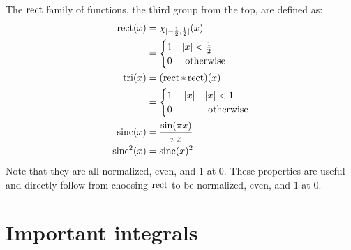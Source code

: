 The $\operatorname{rect}$ family of functions,
the third group from the top,
are defined as:
\[\begin{aligned}
	\rect(x) &= \chi_{[-\frac{1}{2},\frac{1}{2}]}(x) \\
	&= \begin{cases} 1 & |x| < \frac{1}{2}\\ 0 &$ otherwise$\end{cases}\\
	\tri(x) & = (\rect*\rect)(x) \\
	&= \begin{cases} 1- |x| & |x| < 1\\ 0 &$ otherwise$\end{cases}\\
	\sinc(x) &= \frac{\sin(\pi x)}{\pi x}\\
	\sinc^2(x) &= \sinc(x)^2\\
\end{aligned}\]
Note that they are all normalized, even, and $1$ at $0$.
These properties are useful and directly follow from choosing $\operatorname{rect}$ to be normalized, even, and $1$ at $0$.

\section{Important integrals}

